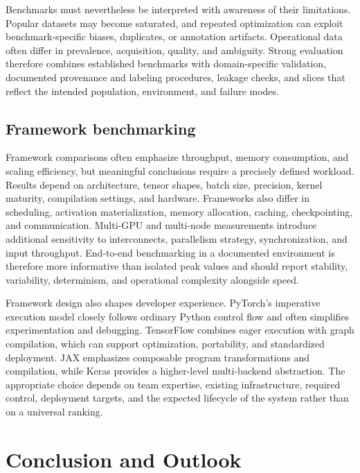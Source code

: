 \documentclass{article}
\begin{document}
Benchmarks must nevertheless be interpreted with awareness of their limitations. Popular datasets may become saturated, and repeated optimization can exploit benchmark-specific biases, duplicates, or annotation artifacts. Operational data often differ in prevalence, acquisition, quality, and ambiguity. Strong evaluation therefore combines established benchmarks with domain-specific validation, documented provenance and labeling procedures, leakage checks, and slices that reflect the intended population, environment, and failure modes.


\subsection{Framework benchmarking}

Framework comparisons often emphasize throughput, memory consumption, and scaling efficiency, but meaningful conclusions require a precisely defined workload. Results depend on architecture, tensor shapes, batch size, precision, kernel maturity, compilation settings, and hardware. Frameworks also differ in scheduling, activation materialization, memory allocation, caching, checkpointing, and communication. Multi-GPU and multi-node measurements introduce additional sensitivity to interconnects, parallelism strategy, synchronization, and input throughput. End-to-end benchmarking in a documented environment is therefore more informative than isolated peak values and should report stability, variability, determinism, and operational complexity alongside speed.

Framework design also shapes developer experience. PyTorch's imperative execution model closely follows ordinary Python control flow and often simplifies experimentation and debugging. TensorFlow combines eager execution with graph compilation, which can support optimization, portability, and standardized deployment. JAX emphasizes composable program transformations and compilation, while Keras provides a higher-level multi-backend abstraction. The appropriate choice depends on team expertise, existing infrastructure, required control, deployment targets, and the expected lifecycle of the system rather than on a universal ranking.


\section{Conclusion and Outlook}
\end{document}

